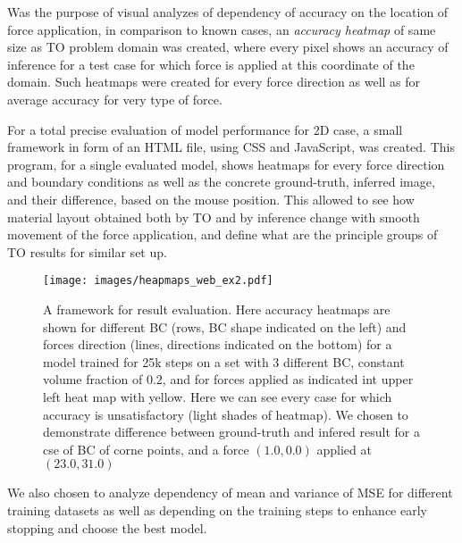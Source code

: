 Was the purpose of visual analyzes of dependency of accuracy on the location of force application, in comparison to known cases, an \textit{accuracy heatmap} of same size as TO problem domain was created, where every pixel shows an accuracy of inference for a test case for which force is applied at this coordinate of the domain. 
Such heatmaps were created for every force direction as well as for average accuracy for very type of force.

For a total precise evaluation of model performance for 2D case, a small framework in form of an HTML file, using CSS and JavaScript, was created.
This program, for a single evaluated model, shows heatmaps for every force direction and boundary conditions as well as the concrete ground-truth, inferred image, and their difference, based on the mouse position.
This allowed to see how material layout obtained both by TO and by inference change with smooth movement of the force application, and define what are the principle groups of TO results for similar set up.
\begin{figure}[h]
	\centering
	\texttt{[image: images/heapmaps\_web\_ex2.pdf]}
	\caption{A framework for result evaluation. Here accuracy heatmaps are shown for different BC (rows, BC shape indicated on the left) and forces direction (lines, directions indicated on the bottom) for a model trained for 25k steps on a set with 3 different BC, constant volume fraction of $0.2$, and for forces applied as indicated int upper left heat map with yellow. Here we can see every case for which accuracy is unsatisfactory (light shades of heatmap). We chosen to demonstrate difference between ground-truth and infered result for a cse of BC of corne points, and a force $(1.0,0.0)$ applied at $(23.0,31.0)$ }
	\label{fig:to_flow}
\end{figure}

We also chosen to analyze dependency of mean and variance of MSE for different training datasets as well as depending on the training steps to enhance early stopping and choose the best model.